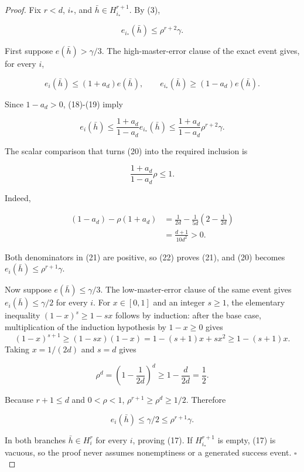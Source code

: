 \begin{proof}
Fix \(r<d\), \(i_*\), and
\(\bar h\in H_{i_*}^{r+1}\). By (3),

\[
 e_{i_*}(\bar h)\le\rho^{r+2}\gamma.
\tag{18}
\]

First suppose \(e(\bar h)>\gamma/3\). The high-master-error clause of the
exact  event gives, for every \(i\),

\[
 e_i(\bar h)\le(1+a_d)e(\bar h),
 \qquad
 e_{i_*}(\bar h)\ge(1-a_d)e(\bar h).
\tag{19}
\]

Since \(1-a_d>0\), (18)-(19) imply

\[
 e_i(\bar h)
 \le \frac{1+a_d}{1-a_d}e_{i_*}(\bar h)
 \le \frac{1+a_d}{1-a_d}\rho^{r+2}\gamma.
\tag{20}
\]

The scalar comparison that turns (20) into the required inclusion is

\[
 \frac{1+a_d}{1-a_d}\rho\le1.
\tag{21}
\]

Indeed,

\[
\begin{aligned}
 (1-a_d)-\rho(1+a_d)
 &=\frac{1}{2d}-\frac{1}{5d}
      \left(2-\frac{1}{2d}\right)\\
 &=\frac{d+1}{10d^2}>0.
\end{aligned}
\tag{22}
\]

Both denominators in (21) are positive, so (22) proves (21), and (20)
becomes \(e_i(\bar h)\le\rho^{r+1}\gamma\).

Now suppose \(e(\bar h)\le\gamma/3\). The low-master-error clause of the
same  event gives \(e_i(\bar h)\le\gamma/2\) for every \(i\).
For \(x\in[0,1]\) and an integer \(s\ge1\), the elementary inequality
\((1-x)^s\ge1-sx\) follows by induction: after the base case, multiplication
of the induction hypothesis by \(1-x\ge0\) gives
\[
 (1-x)^{s+1}\ge(1-sx)(1-x)
 =1-(s+1)x+sx^2\ge1-(s+1)x.
\]
Taking \(x=1/(2d)\) and \(s=d\) gives

\[
 \rho^d=\left(1-\frac{1}{2d}\right)^d
 \ge1-\frac{d}{2d}=\frac12.
\tag{23}
\]

Because \(r+1\le d\) and \(0<\rho<1\),
\(\rho^{r+1}\ge\rho^d\ge1/2\). Therefore

\[
 e_i(\bar h)\le\gamma/2\le\rho^{r+1}\gamma.
\tag{24}
\]

In both branches \(\bar h\in H_i^r\) for every \(i\), proving (17).
If \(H_{i_*}^{r+1}\) is empty, (17) is vacuous, so the proof never assumes
nonemptiness or a generated success event. \(\square\)


\end{proof}

